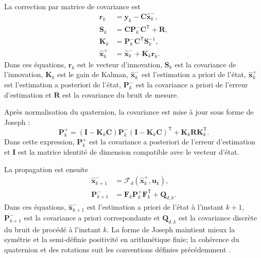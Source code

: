 \documentclass[11pt,a4paper,oneside]{report}
\newcommand{\vect}[1]{\bm{#1}}
\newcommand{\trans}{^{\mathsf T}}
\begin{document}
La correction par matrice de covariance est
\begin{subequations}
	\label{eq_ekf_correction}
	\begin{align}
		\vect r_k&=\vect y_k-\mathbf C\hat{\vect x}_k^{-},\\
		\mathbf S_k&=\mathbf C\mathbf P_k^{-}\mathbf C\trans+\mathbf R,\\
		\mathbf K_k&=\mathbf P_k^{-}\mathbf C\trans\mathbf S_k^{-1},\\
		\hat{\vect x}_k^{+}&=\hat{\vect x}_k^{-}+\mathbf K_k\vect r_k.
	\end{align}
\end{subequations}
Dans ces équations, $\vect r_k$ est le vecteur d'innovation, $\mathbf S_k$ est la covariance de l'innovation, $\mathbf K_k$ est le gain de Kalman, $\hat{\vect x}_k^{-}$ est l'estimation a priori de l'état, $\hat{\vect x}_k^{+}$ est l'estimation a posteriori de l'état, $\mathbf P_k^{-}$ est la covariance a priori de l'erreur d'estimation et $\mathbf R$ est la covariance du bruit de mesure.

Après normalisation du quaternion, la covariance est mise à jour sous forme de Joseph :
\begin{equation}
	\mathbf P_k^{+}=(\mathbf I-\mathbf K_k\mathbf C)\mathbf P_k^{-}(\mathbf I-\mathbf K_k\mathbf C)\trans+\mathbf K_k\mathbf R\mathbf K_k\trans.
	\label{eq_joseph}
\end{equation}
Dans cette expression, $\mathbf P_k^{+}$ est la covariance a posteriori de l'erreur d'estimation et $\mathbf I$ est la matrice identité de dimension compatible avec le vecteur d'état.

La propagation est ensuite
\begin{subequations}
	\label{eq_ekf_propagation}
	\begin{align}
		\hat{\vect x}_{k+1}^{-}&=\mathcal F_d(\hat{\vect x}_k^{+},\vect u_k),\\
		\mathbf P_{k+1}^{-}&=\mathbf F_k\mathbf P_k^{+}\mathbf F_k\trans+\mathbf Q_{d,k}.
	\end{align}
\end{subequations}
Dans ces équations, $\hat{\vect x}_{k+1}^{-}$ est l'estimation a priori de l'état à l'instant $k+1$, $\mathbf P_{k+1}^{-}$ est la covariance a priori correspondante et $\mathbf Q_{d,k}$ est la covariance discrète du bruit de procédé à l'instant $k$. La forme de Joseph maintient mieux la symétrie et la semi-définie positivité en arithmétique finie; la cohérence du quaternion et des rotations suit les conventions définies précédemment \cite{Sola2017}.
\end{document}
